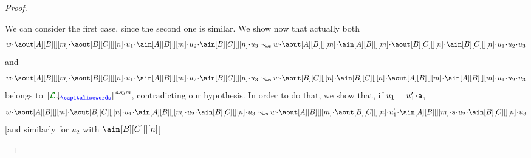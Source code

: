 \begin{proof}
\begin{description}
We can consider the first case, since the second one is similar.
We show now that actually  both
$$\acword\cat\aout[A][B][][m]\cat\aout[B][C][][n]\cat u_1\cat\ain[A][B][][m]\cat u_2\cat\ain[B][C][][n]\cat u_3
\commds 
\acword\cat\aout[A][B][][m]\cat\ain[A][B][][m]\cat\aout[B][C][][n]\cat\ain[B][C][][n]\cat u_1\cat u_2\cat u_3$$
and
$$\acword\cat\aout[A][B][][m]\cat\aout[B][C][][n]\cat u_1\cat\ain[A][B][][m]\cat u_2\cat\ain[B][C][][n]\cat u_3
\commds 
\acword\cat\aout[B][C][][n]\cat\ain[B][C][][n]\cat\aout[A][B][][m]\cat\ain[A][B][][m]\cat u_1\cat u_2\cat u_3$$
belongs to $\asem{\proj{\clang}{}}$, contradicting our hypothesis.
In order to do that, we show that, if $u_1=u'_1\!\cdot\!\mathsf{a}$, 
 $$
 \acword\cat\aout[A][B][][m]\cat\aout[B][C][][n]\cat u_1\cat\ain[A][B][][m]\cat u_2\cat\ain[B][C][][n]\cat u_3
 \commds
 \acword\cat\aout[A][B][][m]\cat\aout[B][C][][n]\cat u'_1\cat\ain[A][B][][m]\cat\aact\cat u_2\cat\ain[B][C][][n]\cat u_3$$
 [and similarly for $u_2$ with $\ain[B][C][][n]$]
 

\end{description}



\end{proof}
